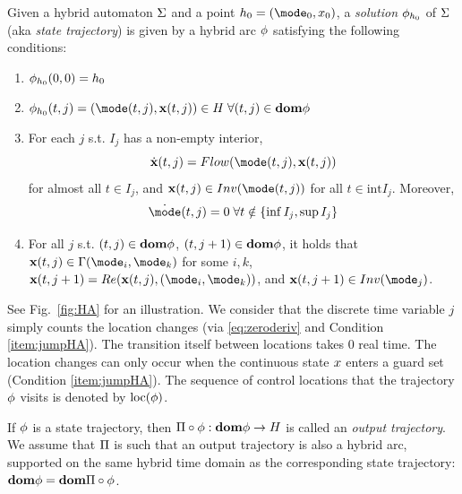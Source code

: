 Given a hybrid automaton $\Sigma$ and a point $\hsPt_0  = (\mode_0, \stPt_0)$, 
a \emph{solution} $\mathbf{\phi}_{h_0}$ of $\Sigma$ (aka \emph{state trajectory}) is given by a hybrid arc $\mathbf{\phi}$ 
satisfying the following conditions:
\begin{enumerate}
	\item $\mathbf{\phi}_{h_0}(0,0) = h_0$
	\item $\hstraj_{h_0}(t,j) = (\mode(t,j),\sttraj(t,j)) \in \hsSet \; \forall (t,j) \in \dom \hstraj$
	\label{item:explicitLX}
	\item For each $j$ s.t. $I_j$ has a non-empty interior, 
	\[\dot{\sttraj}(t,j) = Flow(\mode(t,j),\sttraj(t,j))\]
	for almost all $t \in I_j$, and $\sttraj(t,j) \in Inv(\mode(t,j))$ for all $t \in \text{int}I_j$.
	Moreover, 
	\begin{equation}
	\label{eq:zeroderiv}
	\dot{\mode}(t,j) = 0 \; \forall t \notin \{ \inf I_j, \sup I_j\}
	\end{equation}
	\label{item:contevolutions}
	\item For all $j$ s.t. $(t,j) \in \mathbf{dom} \mathbf{\phi}$, $(t,j+1) \in \mathbf{dom} \mathbf{\phi}$, it holds that $\sttraj(t,j) \in \guard(\mode_i,\mode_k)$ for some $i,k$,
	$\sttraj(t, j+1) = \reset(\sttraj(t,j), (\mode_i,\mode_k))$,
	and $\sttraj(t,j+1) \in Inv(\mode_j)$.
	\label{item:jumpHA}
\end{enumerate}
See Fig.~\ref{fig:HA} for an illustration.
We consider that the discrete time variable $j$ simply counts the location changes (via \eqref{eq:zeroderiv} and Condition \ref{item:jumpHA}).
The transition itself between locations takes 0 real time.
The location changes can only occur when the continuous state $x$ enters a guard set (Condition \ref{item:jumpHA}). 
The sequence of control locations that the trajectory $\mathbf{\phi}$ visits is denoted by $\mbox{loc}(\mathbf{\phi})$.

If $\mathbf{\phi}$ is a state trajectory, then $\Pi \circ \mathbf{\phi}: \mathbf{dom} \mathbf{\phi} \rightarrow H$ is called an \emph{output trajectory}.
We assume that $\Pi$ is such that an output trajectory is also a hybrid arc, supported on the same hybrid time domain as the corresponding state trajectory:
$\mathbf{dom} \mathbf{\phi} = \mathbf{dom} \Pi \circ \mathbf{\phi}$.

